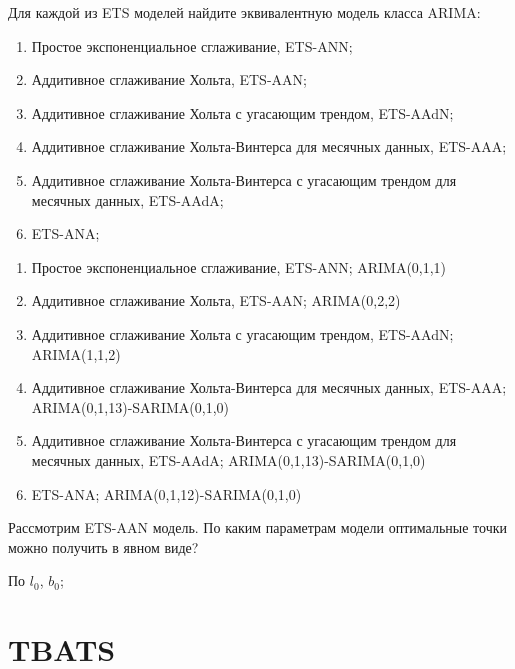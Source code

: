 \begin{problem}
Для каждой из ETS моделей найдите эквивалентную модель класса ARIMA:
	\begin{enumerate}
		\item Простое экспоненциальное сглаживание, ETS-ANN;
		\item Аддитивное сглаживание Хольта, ETS-AAN;
		\item Аддитивное сглаживание Хольта с угасающим трендом, ETS-AAdN;
		\item Аддитивное сглаживание Хольта-Винтерса для месячных данных, ETS-AAA;
		\item Аддитивное сглаживание Хольта-Винтерса с угасающим трендом для месячных данных, ETS-AAdA;
		\item ETS-ANA;
	\end{enumerate}
\begin{sol}
	\begin{enumerate}
		\item Простое экспоненциальное сглаживание, ETS-ANN; ARIMA(0,1,1)
		\item Аддитивное сглаживание Хольта, ETS-AAN; ARIMA(0,2,2)
		\item Аддитивное сглаживание Хольта с угасающим трендом, ETS-AAdN; ARIMA(1,1,2)
		\item Аддитивное сглаживание Хольта-Винтерса для месячных данных, ETS-AAA; ARIMA(0,1,13)-SARIMA(0,1,0)
		\item Аддитивное сглаживание Хольта-Винтерса с угасающим трендом для месячных данных, ETS-AAdA; ARIMA(0,1,13)-SARIMA(0,1,0)
		\item ETS-ANA; ARIMA(0,1,12)-SARIMA(0,1,0)
	\end{enumerate}
\end{sol}
\end{problem}


\begin{problem}
  Рассмотрим ETS-AAN модель. По каким параметрам модели оптимальные точки можно получить в явном виде?


\begin{sol}
По $l_0$, $b_0$;
\end{sol}
\end{problem}





\chapter{TBATS}


